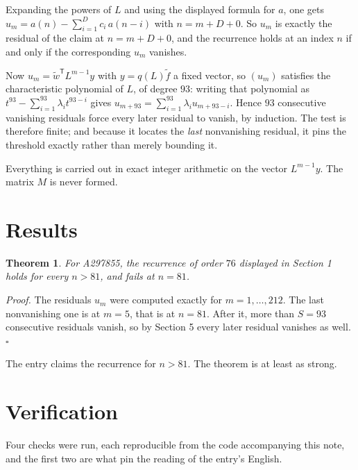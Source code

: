 \documentclass[11pt]{article}
\newtheorem{theorem}{Theorem}
\theoremstyle{definition}
\begin{document}
Expanding the powers of $L$ and using the displayed formula for $a$, one gets $u_m = a(n) - \sum_{i=1}^{D} c_i\,a(n-i)$ with $n = m + D + 0$. So $u_m$ is exactly the residual of the claim at $n = m + D + 0$, and the recurrence holds at an index $n$ if and only if the corresponding $u_m$ vanishes.

Now $u_m = \tilde w^{\mathsf T} L^{m-1} y$ with $y = q(L)\tilde f$ a fixed vector, so $(u_m)$ satisfies the characteristic polynomial of $L$, of degree $93$: writing that polynomial as $t^{93} - \sum_{i=1}^{93} \lambda_i t^{93-i}$ gives $u_{m+93} = \sum_{i=1}^{93} \lambda_i u_{m+93-i}$. Hence $93$ consecutive vanishing residuals force every later residual to vanish, by induction. The test is therefore finite; and because it locates the {\itshape last} nonvanishing residual, it pins the threshold exactly rather than merely bounding it.

Everything is carried out in exact integer arithmetic on the vector $L^{m-1}y$. The matrix $M$ is never formed.

\section{Results}

\begin{theorem} For A297855, the recurrence of order $76$ displayed in Section 1 holds for every $n > 81$, and fails at $n = 81$.\end{theorem}

{\itshape Proof.} The residuals $u_m$ were computed exactly for $m = 1,\dots,212$. The last nonvanishing one is at $m = 5$, that is at $n = 81$. After it, more than $S = 93$ consecutive residuals vanish, so by Section 5 every later residual vanishes as well. $\square$

The entry claims the recurrence for $n > 81$. The theorem is at least as strong.

\section{Verification}

Four checks were run, each reproducible from the code accompanying this note, and the first two are what pin the reading of the entry's English.
\end{document}
